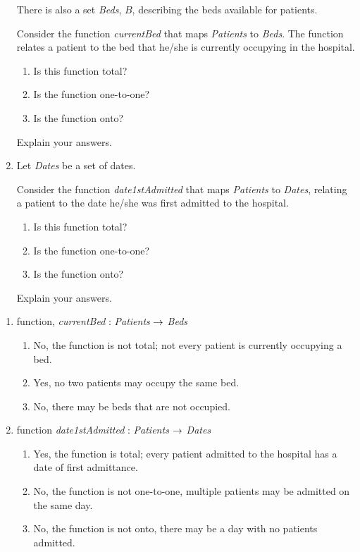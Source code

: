 \begin{questions}
\begin{enumerate}[label=(\alph*),itemsep=0pt,parsep=3pt,topsep=0pt,partopsep=0pt]
	There is also a set \textit{Beds}, $B$, describing the beds available for patients. 

	Consider the function \textit{currentBed} that maps \textit{Patients} to \textit{Beds}. The function relates a patient to the bed that he/she is currently occupying in the hospital. 
	\begin{enumerate}
		\item Is this function total?
		\item Is the function one-to-one?
		\item Is the function onto?
	\end{enumerate}
	Explain your answers.

	\item Let \textit{Dates} be a set of dates. 

	Consider the function \textit{date1stAdmitted} that maps \textit{Patients} to \textit{Dates}, relating a patient to the date he/she was first admitted to the hospital.
	\begin{enumerate}
		\item Is this function total?
		\item Is the function one-to-one?
		\item Is the function onto?
	\end{enumerate}
	Explain your answers.
\end{enumerate}
	\fi	
\begin{solution}
	\begin{enumerate}[label=(\alph*),itemsep=4pt,parsep=0pt,topsep=0pt,partopsep=0pt]
		\item function, \textit{currentBed} :  \textit{Patients} $\rightarrow$ \textit{Beds} 
		\begin{enumerate}
			\item No, the function is not total; not every patient is currently occupying a bed.
			\item Yes, no two patients may occupy the same bed. 
			\item No, there may be beds that are not occupied.
		\end{enumerate}

		\item function \textit{date1stAdmitted} : \textit{Patients} $\rightarrow$ \textit{Dates}
		\begin{enumerate}
			\item Yes, the function is total; every patient admitted to the hospital has a date of first admittance. 
			\item No, the function is not one-to-one, multiple patients may be admitted on the same day. 
			\item No, the function is not onto, there may be a day with no patients admitted. 
		\end{enumerate}


\end{enumerate}
\end{solution}
\end{questions}
